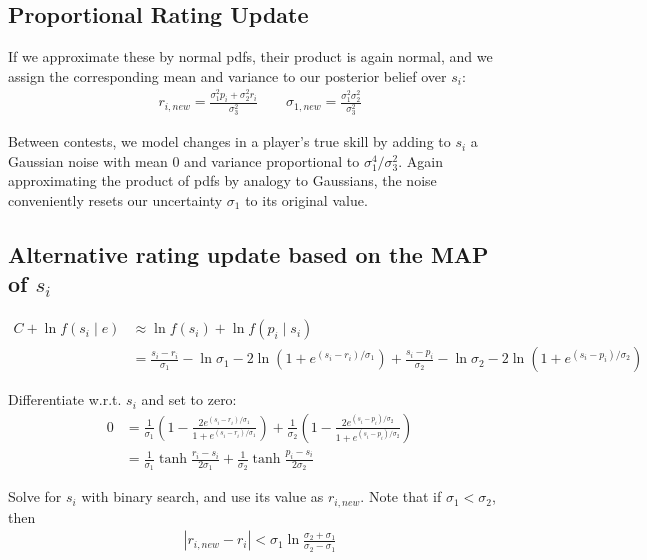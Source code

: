 \documentclass{article}
\begin{document}
\subsection{Proportional Rating Update}

If we approximate these by normal pdfs, their product is again normal, and we assign the corresponding mean and variance to our posterior belief over $s_i$:
\begin{align}
r_{i,new} = \frac{\sigma_1^2p_i + \sigma_2^2r_i}{\sigma_3^2} \qquad \sigma_{1,new} = \frac{\sigma_1^2\sigma_2^2}{\sigma_3^2}
\end{align}

Between contests, we model changes in a player's true skill by adding to $s_i$ a Gaussian noise with mean $0$ and variance proportional to $\sigma_1^4 / \sigma_3^2$. Again approximating the product of pdfs by analogy to Gaussians, the noise conveniently resets our uncertainty $\sigma_1$ to its original value.

\subsection{Alternative rating update based on the MAP of $s_i$}

\begin{align}
C + \ln f(s_i \mid e) &\approx \ln f(s_i) + \ln f(p_i\mid s_i)
\\&= \frac{s_i-r_i}{\sigma_1} - \ln \sigma_1 - 2\ln\left(1 + e^{(s_i-r_i)/\sigma_1} \right)
	+\frac{s_i-p_i}{\sigma_2} - \ln \sigma_2 - 2\ln\left(1 + e^{(s_i-p_i)/\sigma_2} \right)
\end{align}

Differentiate w.r.t. $s_i$ and set to zero:
\begin{align}
0 &= \frac{1}{\sigma_1}\left( 1 - \frac {2e^{(s_i-r_i)/\sigma_1}} {1 + e^{(s_i-r_i)/\sigma_1}} \right)
	+ \frac{1}{\sigma_2}\left( 1 - \frac {2e^{(s_i-p_i)/\sigma_2}} {1 + e^{(s_i-p_i)/\sigma_2}} \right)
\\ &= \frac{1}{\sigma_1} \tanh \frac {r_i-s_i} {2\sigma_1}
	+ \frac{1}{\sigma_2} \tanh \frac {p_i-s_i} {2\sigma_2}
\end{align}

Solve for $s_i$ with binary search, and use its value as $r_{i,new}$. Note that if $\sigma_1 < \sigma_2$, then
\begin{align}
|r_{i,new} - r_i| < \sigma_1 \ln\frac {\sigma_2+\sigma_1} {\sigma_2-\sigma_1}
\end{align}
\end{document}
